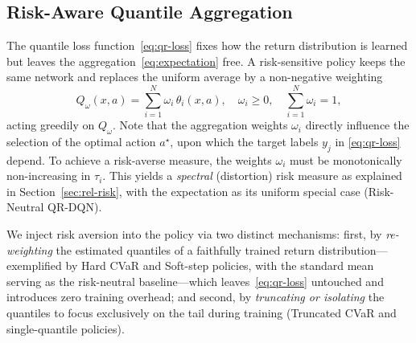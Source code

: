 \documentclass{ieeetmlcn}
\begin{document}
\subsection{Risk-Aware Quantile Aggregation}
\label{sec:method-risk}
The quantile loss function~\eqref{eq:qr-loss} fixes how the return distribution is
learned but leaves the aggregation~\eqref{eq:expectation} free. A risk-sensitive
policy keeps the same network and replaces the uniform average by a non-negative
weighting
\begin{equation}
Q_\omega(x,a) = \sum_{i=1}^{N}\omega_i\,\theta_i(x,a),
\quad \omega_i\ge 0,\quad \textstyle\sum_{i=1}^{N}\omega_i = 1,
\label{eq:risk-agg}
\end{equation}
acting greedily on $Q_\omega$. Note that the aggregation weights $\omega_i$ directly influence the selection of the optimal action $a^\star$, upon which the target labels $y_j$ in \eqref{eq:qr-loss} depend. To achieve a risk-averse measure, the weights $\omega_i$ must be monotonically non-increasing in $\tau_i$. This yields a \emph{spectral} (distortion) risk measure as explained in Section~\ref{sec:rel-risk}, with the expectation as its uniform special case (Risk-Neutral QR-DQN).

We inject risk aversion into the policy via two distinct mechanisms: first, by \emph{re-weighting} the estimated quantiles of a faithfully trained return distribution---exemplified by Hard CVaR and Soft-step policies, with the standard mean serving as the risk-neutral baseline---which leaves~\eqref{eq:qr-loss} untouched and introduces zero training overhead; and second, by \emph{truncating or isolating} the quantiles to focus exclusively on the tail during training (Truncated CVaR and single-quantile policies).
\end{document}
